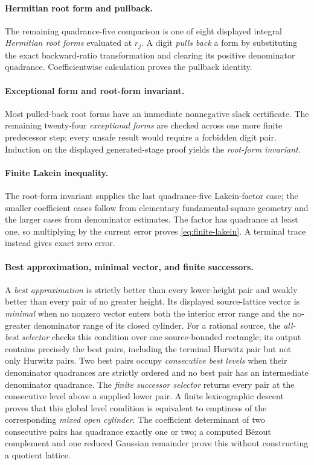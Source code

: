 \documentclass[11pt]{article}
\begin{document}
\paragraph{Hermitian root form and pullback.}
The remaining quadrance-five comparison is one of eight displayed integral
\emph{Hermitian root forms} evaluated at $r_j$.  A digit \emph{pulls back} a
form by substituting the exact backward-ratio transformation and clearing its
positive denominator quadrance.  Coefficientwise calculation proves the
pullback identity.

\paragraph{Exceptional form and root-form invariant.}
Most pulled-back root forms have an immediate nonnegative slack certificate.
The remaining twenty-four \emph{exceptional forms} are checked across one
more finite predecessor step; every unsafe result would require a forbidden
digit pair.  Induction on the displayed generated-stage proof yields the
\emph{root-form invariant}.

\paragraph{Finite Lakein inequality.}
The root-form invariant supplies the last quadrance-five Lakein-factor case;
the smaller coefficient cases follow from elementary fundamental-square
geometry and the larger cases from denominator estimates.  The factor has
quadrance at least one, so multiplying by the current error proves
\eqref{eq:finite-lakein}.  A terminal trace instead gives exact zero error.

\paragraph{Best approximation, minimal vector, and finite successors.}
A \emph{best approximation} is strictly better than every lower-height pair
and weakly better than every pair of no greater height.  Its displayed
source-lattice vector is \emph{minimal} when no nonzero vector enters both
the interior error range and the no-greater denominator range of its closed
cylinder.  For a rational source, the \emph{all-best selector} checks this
condition over one source-bounded rectangle; its output contains precisely
the best pairs, including the terminal Hurwitz pair but not only Hurwitz
pairs.  Two best pairs occupy \emph{consecutive best levels} when their
denominator quadrances are strictly ordered and no best pair has an
intermediate denominator quadrance.  The \emph{finite successor selector}
returns every pair at the consecutive level above a supplied lower pair.  A
finite lexicographic descent proves that this global level condition is
equivalent to emptiness of the corresponding \emph{mixed open cylinder}.
The coefficient determinant of two consecutive pairs has quadrance exactly
one or two; a computed B\'ezout complement and one reduced Gaussian remainder
prove this without constructing a quotient lattice.
\end{document}
